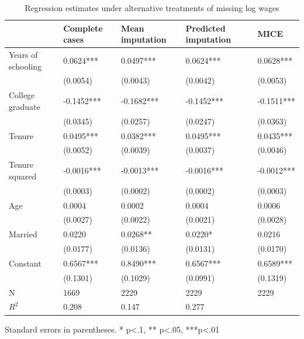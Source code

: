 \begin{table}[H]
\caption{Regression estimates under alternative treatments of missing log wages}
\label{tab:regression}
\begin{center}
\begin{tabular}{lllll}
\hline
               & Complete cases & Mean imputation & Predicted imputation & MICE        \\
\hline
Years of schooling & 0.0624***      & 0.0497***       & 0.0624***            & 0.0628***   \\
               & (0.0054)       & (0.0043)        & (0.0042)             & (0.0053)    \\
College graduate & -0.1452***     & -0.1682***      & -0.1452***           & -0.1511***  \\
               & (0.0345)       & (0.0257)        & (0.0247)             & (0.0363)    \\
Tenure & 0.0495***      & 0.0382***       & 0.0495***            & 0.0435***   \\
               & (0.0052)       & (0.0039)        & (0.0037)             & (0.0046)    \\
Tenure squared & -0.0016***     & -0.0013***      & -0.0016***           & -0.0012***  \\
               & (0.0003)       & (0.0002)        & (0.0002)             & (0.0003)    \\
Age & 0.0004         & 0.0002          & 0.0004               & 0.0006      \\
               & (0.0027)       & (0.0022)        & (0.0021)             & (0.0028)    \\
Married & 0.0220         & 0.0268**        & 0.0220*              & 0.0216      \\
               & (0.0177)       & (0.0136)        & (0.0131)             & (0.0170)    \\
Constant & 0.6567***      & 0.8490***       & 0.6567***            & 0.6589***   \\
               & (0.1301)       & (0.1029)        & (0.0991)             & (0.1319)    \\
N              & 1669           & 2229            & 2229                 & 2229        \\
$R^2$ & 0.208          & 0.147           & 0.277                &             \\
\hline
\end{tabular}
\end{center}
\end{table}
\bigskip
Standard errors in parentheses. \newline 
* p<.1, ** p<.05, ***p<.01